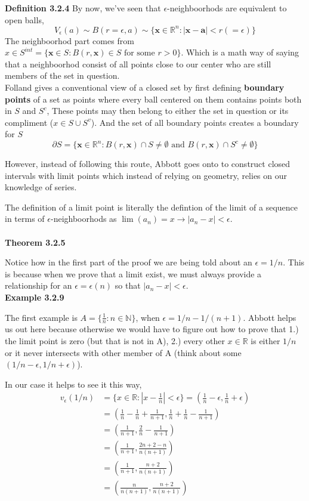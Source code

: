 \textbf{Definition 3.2.4}
By now, we've seen that $\epsilon$-neighboorhods are equivalent to open balls,
$$
V_{\epsilon} (a) \sim B(r=\epsilon, a) \sim \{ \mathbf{x}\in\mathbb{R}^n : |\mathbf{x} - \mathbf{a}| < r(=\epsilon) \}
$$
The neighboorhod part comes from $x\in S^{int} = \{ \mathbf{x}\in S : B(r,\mathbf{x}) \in S \text{ for some } r>0 \}$.
Which is a math way of saying that a neighboorhod consist of all points close to our center who are
still members of the set in question.
\\

Folland gives a conventional view of a closed set by first defining \textbf{boundary points}
of a set as points where every ball centered on them contains points both in $S$ and $S^c$,
These points may then belong to either the set in question or its compliment ($x\in S \cup S^v$).
And the set of all boundary points creates a boundary for $S$
$$
\partial S = \{ \mathbf{x}\in\mathbb{R}^n : B(r,\mathbf{x})\cap S \neq \emptyset \text{ and }
    B(r,\mathbf{x})\cap S^c \neq \emptyset \}
$$

However, instead of following this route, Abbott goes onto to construct closed intervals
with limit points which instead of relying on geometry, relies on our knowledge of series.

The definition of a limit point is literally the defintion of the limit of a sequence in terms of
$\epsilon$-neighboorhods as $\lim (a_n) = x \rightarrow |a_n - x| < \epsilon$.
\\~\\


\textbf{Theorem 3.2.5}

Notice how in the first part of the proof we are being told about an $\epsilon = 1/n$.
This is because when we prove that a limit exist, we must always provide a relationship for an
$\epsilon = \epsilon (n)$ so that $|a_n - x|<\epsilon$.
\\


\textbf{Example 3.2.9}

The first example is $A = \{ \frac{1}{n} : n\in\mathbb{N} \}$, when $\epsilon = 1/n - 1/(n+1)$.
Abbott helps us out here because otherwise we would have to figure out how to prove that
1.) the limit point is zero (but that is not in A), 2.) every other $x\in\mathbb{R}$ is either
$1/n$ or it never intersects with other member of A (think about some $(1/n - \epsilon, 1/n +\epsilon)$).

In our case it helps to see it this way,
\begin{align*}
v_{\epsilon} (1/n) &= \{ x\in\mathbb{R} : \left|x - \frac{1}{n}\right| < \epsilon \} = \left(\frac{1}{n} - \epsilon, \frac{1}{n} + \epsilon \right) \\
&= \left(\frac{1}{n} - \frac{1}{n} + \frac{1}{n+1}, \frac{1}{n} + \frac{1}{n} - \frac{1}{n+1} \right) \\
&= \left(\frac{1}{n+1}, \frac{2}{n} - \frac{1}{n+1} \right) \\
&= \left(\frac{1}{n+1}, \frac{2n + 2 - n}{n(n+1)} \right) \\
&= \left(\frac{1}{n+1}, \frac{n + 2}{n(n+1)} \right) \\
&= \left(\frac{n}{n(n+1)}, \frac{n + 2}{n(n+1)} \right)
\end{align*}

